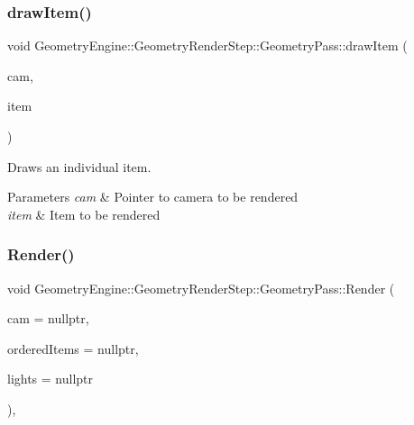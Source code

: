 \subsubsection{\texorpdfstring{drawItem()}{drawItem()}}
{\footnotesize\ttfamily void Geometry\+Engine\+::\+Geometry\+Render\+Step\+::\+Geometry\+Pass\+::draw\+Item (\begin{DoxyParamCaption}\item[{\mbox{\hyperlink{class_geometry_engine_1_1_geometry_world_item_1_1_geometry_camera_1_1_camera}{Geometry\+World\+Item\+::\+Geometry\+Camera\+::\+Camera}} $\ast$}]{cam,  }\item[{\mbox{\hyperlink{class_geometry_engine_1_1_geometry_world_item_1_1_geometry_item_1_1_geometry_item}{Geometry\+World\+Item\+::\+Geometry\+Item\+::\+Geometry\+Item}} $\ast$}]{item }\end{DoxyParamCaption})\hspace{0.3cm}{\ttfamily [protected]}}

Draws an individual item. 
\begin{DoxyParams}{Parameters}
{\em cam} & Pointer to camera to be rendered \\
\hline
{\em item} & Item to be rendered \\
\hline
\end{DoxyParams}
\mbox{\label{class_geometry_engine_1_1_geometry_render_step_1_1_geometry_pass_a8c508e9f74abd051a8908bb1a568ea50}} 
\subsubsection{\texorpdfstring{Render()}{Render()}}
{\footnotesize\ttfamily void Geometry\+Engine\+::\+Geometry\+Render\+Step\+::\+Geometry\+Pass\+::\+Render (\begin{DoxyParamCaption}\item[{\mbox{\hyperlink{class_geometry_engine_1_1_geometry_world_item_1_1_geometry_camera_1_1_camera}{Geometry\+World\+Item\+::\+Geometry\+Camera\+::\+Camera}} $\ast$}]{cam = {\ttfamily nullptr},  }\item[{std\+::map$<$ float, \mbox{\hyperlink{class_geometry_engine_1_1_geometry_world_item_1_1_geometry_item_1_1_geometry_item}{Geometry\+World\+Item\+::\+Geometry\+Item\+::\+Geometry\+Item}} $\ast$ $>$ $\ast$}]{ordered\+Items = {\ttfamily nullptr},  }\item[{std\+::unordered\+\_\+set$<$ \mbox{\hyperlink{class_geometry_engine_1_1_geometry_world_item_1_1_geometry_light_1_1_light}{Geometry\+World\+Item\+::\+Geometry\+Light\+::\+Light}} $\ast$ $>$ $\ast$}]{lights = {\ttfamily nullptr} }\end{DoxyParamCaption})\hspace{0.3cm}{\ttfamily [override]}, {\ttfamily [virtual]}}


